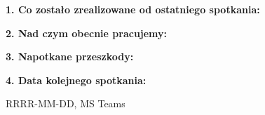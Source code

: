 \documentclass[a4paper,12pt]{article}
\begin{document}

\nextitem
\textbf{1. Co zostało zrealizowane od ostatniego spotkania:}
\par\vspace{0.3cm}

\nextitem
\textbf{2. Nad czym obecnie pracujemy:}
\par\vspace{0.3cm}

\nextitem
\textbf{3. Napotkane przeszkody:}
\par\vspace{0.3cm}

\nextitem
\textbf{4. Data kolejnego spotkania:}
\par\vspace{0.3cm}
RRRR-MM-DD, MS Teams
\end{document}
